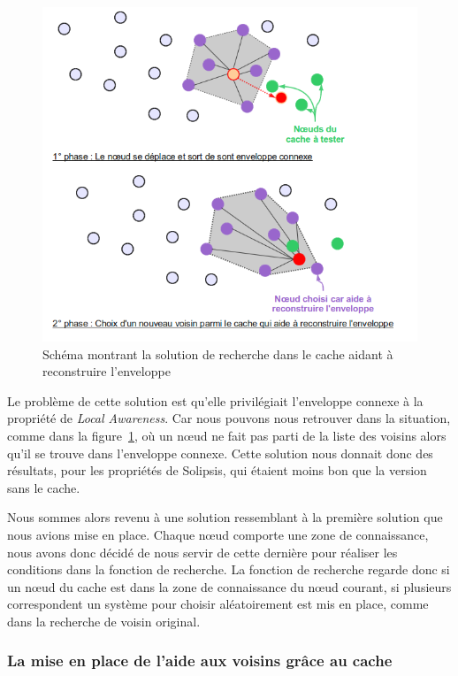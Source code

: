 	\begin{figure}[!h]
        \centering
        \includegraphics[scale=0.45]{./Ressources/Images/cacheReconstructEnvelop.png}
        \caption{Schéma montrant la solution de recherche dans le cache aidant à reconstruire l'enveloppe}
        \label{schemaEnvelopCache}
        \end{figure}
\par Le problème de cette solution est qu'elle privilégiait l'enveloppe connexe à la propriété de \textit{Local Awareness}. Car nous pouvons nous retrouver dans la situation, comme dans la figure~\ref{schemaEnvelopCache}, où un nœud ne fait pas parti de la liste des voisins alors qu'il se trouve dans l'enveloppe connexe. Cette solution nous donnait donc des résultats, pour les propriétés de Solipsis, qui étaient moins bon que la version sans le cache.  

\par Nous sommes alors revenu à une solution ressemblant à la première solution que nous avions mise en place. Chaque nœud comporte une zone de connaissance, nous avons donc décidé de nous servir de cette dernière pour réaliser les conditions dans la fonction de recherche. La fonction de recherche regarde donc si un nœud du cache est dans la zone de connaissance du nœud courant, si plusieurs correspondent un système pour choisir aléatoirement est mis en place, comme dans la recherche de voisin original.


\subsubsection{La mise en place de l'aide aux voisins grâce au cache}

